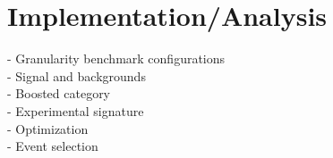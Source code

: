 
\section{Implementation/Analysis}
\label{sec:imple}

- Granularity benchmark configurations \\
- Signal and backgrounds \\
- Boosted category\\
- Experimental signature\\
- Optimization \\
- Event selection \\

